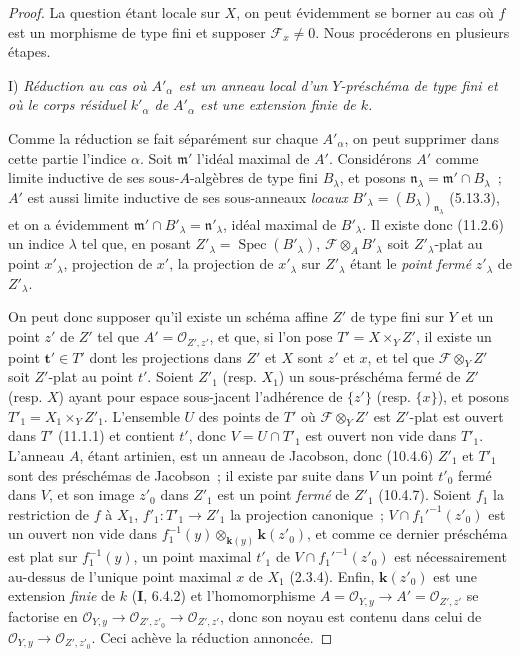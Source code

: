 \begin{proof}
La question étant locale sur $X$, on peut évidemment se borner au cas où $f$
est un morphisme de type fini et supposer $\mathcal F_x\neq0$. Nous procéderons
en plusieurs étapes.

\medskip
\noindent I) \emph{Réduction au cas où $A'_\alpha$ est un anneau local
d'un $Y$-préschéma de type fini et où le corps résiduel $k'_\alpha$ de
$A'_\alpha$ est une extension finie de $k$.}

\medskip
Comme la réduction se fait séparément sur chaque $A'_\alpha$, on peut supprimer
dans cette partie l'indice $\alpha$. Soit $\mathfrak m'$ l'idéal maximal de
$A'$. Considérons $A'$ comme limite inductive de ses sous-$A$-algèbres de type
fini $B_\lambda$, et posons $\mathfrak n_\lambda=\mathfrak m'\cap B_\lambda$~;
$A'$ est aussi limite inductive de ses sous-anneaux \emph{locaux}
$B'_\lambda=(B_\lambda)_{\mathfrak n_\lambda}$ (5.13.3), et on a évidemment
$\mathfrak m'\cap B'_\lambda=\mathfrak n'_\lambda$, idéal maximal de
$B'_\lambda$. Il existe donc (11.2.6) un indice $\lambda$ tel que, en posant
$Z'_\lambda=\operatorname{Spec}(B'_\lambda)$,
$\mathcal F\otimes_A B'_\lambda$ soit $Z'_\lambda$-plat au point $x'_\lambda$,
projection de $x'$, la projection de $x'_\lambda$ sur $Z'_\lambda$ étant le
\emph{point fermé} $z'_\lambda$ de $Z'_\lambda$.

On peut donc supposer qu'il existe un schéma affine $Z'$ de type fini sur $Y$
et un point $z'$ de $Z'$ tel que $A'=\mathcal O_{Z',z'}$, et que, si l'on pose
$T'=X\times_Y Z'$, il existe un point $\boldsymbol{t}'\in T'$ dont les projections dans
$Z'$ et $X$ sont $z'$ et $x$, et tel que $\mathcal F\otimes_Y Z'$ soit
$Z'$-plat au point $t'$. Soient $Z'_1$ (resp. $X_1$) un sous-préschéma fermé de
$Z'$ (resp. $X$) ayant pour espace sous-jacent l'adhérence de $\{z'\}$ (resp.
$\{x\}$), et posons $T'_1=X_1\times_Y Z'_1$. L'ensemble $U$ des points de
$T'$ où $\mathcal F\otimes_Y Z'$ est $Z'$-plat est ouvert dans $T'$ (11.1.1) et
contient $t'$, donc
$V=U\cap T'_1$ est ouvert non vide dans $T'_1$. L'anneau $A$, étant artinien,
est un anneau de Jacobson, donc (10.4.6) $Z'_1$ et $T'_1$ sont des préschémas de
Jacobson~; il existe par suite dans $V$ un point $t'_0$ fermé dans $V$, et son
image $z'_0$ dans $Z'_1$ est un point \emph{fermé} de $Z'_1$ (10.4.7). Soient $f_1$ la
restriction de $f$ à $X_1$, $f'_1:T'_1\to Z'_1$ la projection canonique~;
$V\cap f_1'^{-1}(z'_0)$ est un ouvert non vide dans
$f_1^{-1}(y)\otimes_{\mathbf{k}(y)}\boldsymbol{k}(z'_0)$, et comme ce dernier préschéma est plat sur
$f_1^{-1}(y)$, un point maximal $t'_1$ de $V\cap f_1'^{-1}(z'_0)$ est
nécessairement au-dessus de l'unique point maximal $x$ de $X_1$ (2.3.4).
Enfin, $\boldsymbol{k}(z'_0)$ est une extension \emph{finie} de $k$ (\textbf I, 6.4.2) et
l'homomorphisme $A=\mathcal O_{Y,y}\to A'=\mathcal O_{Z',z'}$ se factorise en
$\mathcal O_{Y,y}\to\mathcal O_{Z',z'_0}\to\mathcal O_{Z',z'}$, donc son noyau
est contenu dans celui de $\mathcal O_{Y,y}\to\mathcal O_{Z',z'_0}$. Ceci
achève la réduction annoncée.


\end{proof}
